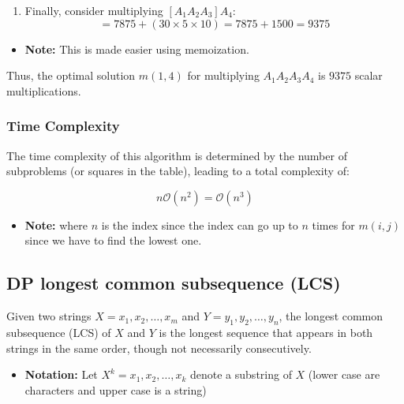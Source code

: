 \begin{example}
\begin{itemize}
\begin{enumerate}
            \item Finally, consider multiplying \([A_1 A_2 A_3] A_4\):
            \[
            = 7875 + (30 \times 5 \times 10) = 7875 + 1500 = 9375
            \]
        \end{enumerate}
        \begin{itemize}
            \item \textbf{Note:} This is made easier using memoization.
        \end{itemize}
        Thus, the optimal solution $m(1,4)$ for multiplying \(A_1 A_2 A_3 A_4\) is \(9375\) scalar multiplications.
    \end{itemize}
    \vspace{1em}
\end{example}

\subsubsection{Time Complexity}
\begin{definition}
    The time complexity of this algorithm is determined by the number of subproblems (or squares in the table), leading to a total complexity of:

    \[
    n \mathcal{O}(n^2) = \mathcal{O}(n^3)
    \]
    \begin{itemize}
        \item \textbf{Note:} where \(n\) is the index since the index can go up to $n$ times for $m(i,j)$ since we have to find the lowest one. 
    \end{itemize}
\end{definition}

\subsection{DP longest common subsequence (LCS)}
\begin{definition}
Given two strings \(X = x_1, x_2, \dots, x_m\) and \(Y = y_1, y_2, \dots, y_n\), the longest common subsequence (LCS) of \(X\) and \(Y\) is the longest sequence that appears in both strings in the same order, though not necessarily consecutively.
\begin{itemize}
    \item \textbf{Notation:} Let \(X^k = x_1, x_2, \dots, x_k\) denote a substring of \(X\) (lower case are characters and upper case is a string)
\end{itemize}
\end{definition}

